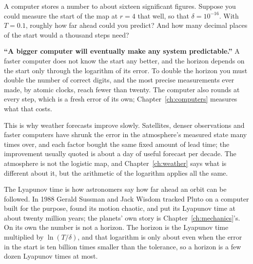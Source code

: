 
\begin{think}
A computer stores a number to about sixteen significant figures. Suppose you
could measure the start of the map at $r = 4$ that well, so that
$\delta = 10^{-16}$. With $T = \num{0.1}$, roughly how far ahead could you
predict? And how many decimal places of the start would a thousand steps
need?
\end{think}

\begin{trapbox}
\textbf{\enquote{A bigger computer will eventually make any system
predictable.}} A faster computer does not know the start any better, and the
horizon depends on the start only through the logarithm of its error. To
double the horizon you must double the number of correct digits, and the most
precise measurements ever made, by atomic clocks, reach fewer than twenty.
The computer also rounds at every step, which is a fresh error of its own;
Chapter~\ref{ch:computers} measures what that costs.
\end{trapbox}

\noindent
This is why weather forecasts improve slowly. Satellites, denser
observations and faster computers have shrunk the error in the atmosphere's
measured state many times over, and each factor bought the same fixed amount
of lead time; the improvement usually quoted is about a day of useful
forecast per decade. The atmosphere is not the logistic map, and
Chapter~\ref{ch:weather} says what is different about it, but the arithmetic
of the logarithm applies all the same.

\begin{worldbox}
The Lyapunov time is how astronomers say how far ahead an orbit can be
followed. In 1988 Gerald Sussman and Jack Wisdom tracked Pluto on a computer
built for the purpose, found its motion chaotic, and put its Lyapunov time at
about twenty million years; the planets' own story is
Chapter~\ref{ch:mechanics}'s. On its own the number is not a horizon. The
horizon is the Lyapunov time multiplied by $\ln(T/\delta)$, and that
logarithm is only about  even when the error in the
start is ten billion times smaller than the tolerance, so a horizon is a few
dozen Lyapunov times at most.
\end{worldbox}

